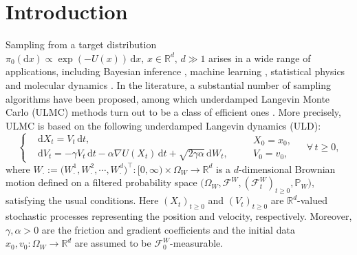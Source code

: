 \documentclass[12pt]{article}
\numberwithin{equation}{section}
\newcommand{\R}{\mathbb{R}}
\begin{document}
\section{Introduction}


Sampling from a target distribution 
$
\pi_0 (\mathrm{d} x) \propto \exp (-U( x)) \, \mathrm{d} x,
    \,
    x \in \mathbb{R}^d,
    \,
    d \gg 1
$
arises in a wide range of applications, including Bayesian inference \cite{mandt2017stochastic,ma2015complete,durmus2019high}, machine learning \cite{andrieu2003introduction}, statistical physics and molecular dynamics \cite{pastor1988analysis}. 
%
In the literature, a substantial number of sampling algorithms have been proposed, among which underdamped Langevin Monte Carlo (ULMC) methods turn out to be a class of efficient ones \cite{cao2023explicit,cheng2018underdamped,dalalyan2020sampling}.
More precisely, ULMC is based on the following underdamped Langevin dynamics (ULD):
\begin{equation}
\label{eq:ULD} 
\left\{
\begin{aligned}
&  \mathrm{d}X_t 
= 
V_t \,\mathrm{d}t, 
\\  &
\mathrm{d}V_t 
= 
-
\gamma V_t \,\mathrm{d}t 
- 
\alpha\nabla U(X_t) \,\mathrm{d}t
+ 
\sqrt{2\gamma\alpha} \,\mathrm{d}W_t,
\end{aligned}
\right.
\quad 
\begin{aligned}
& X_0   =  x_0,
\\
&V_0  =  v_0, 
\end{aligned}
\quad \, 
\forall \, t \ge 0,
\end{equation}
where $W_\cdot := \big(W^1_\cdot, W^2_\cdot, \cdots , W^d_\cdot\big)^\top \colon [0, \infty)\times \Omega_W \to \R^d$ is a $d$-dimensional Brownian motion defined on a filtered probability space $\big(\Omega_W , \mathcal{F}^W , (\mathcal{F}^W_t)_{t\geq0}, \mathbb{P}_W \big)$, satisfying the usual conditions.
Here $(X_t)_{t\geq 0}$ and $(V_t)_{t\geq 0}$ are $\mathbb{R}^d$-valued stochastic processes representing the position and velocity, respectively. Moreover, $\gamma, \alpha > 0$ are the friction and gradient coefficients and the initial data $x_0, v_0 : \Omega_W \to \R^d $ are assumed to be $\mathcal{F}_0^W$-measurable.
\end{document}
